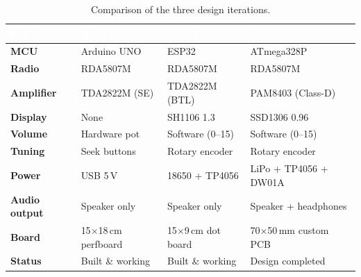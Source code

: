 \begin{table}[htbp]
\centering
\caption{Comparison of the three design iterations.}
\label{tab:iteration-comparison}
\small
\renewcommand{\arraystretch}{1.25}
\begin{tabularx}{\textwidth}{>{\bfseries}l X X X}
\toprule
\rowcolor{tablehead}
\textcolor{white}{\textsf{Feature}} &
\textcolor{white}{\textsf{Iter.\ 1}} &
\textcolor{white}{\textsf{Iter.\ 2}} &
\textcolor{white}{\textsf{Iter.\ 3}} \\
\midrule
\rowcolor{zebrarow}
MCU         & Arduino UNO          & ESP32                & ATmega328P \\
Radio       & RDA5807M             & RDA5807M             & RDA5807M \\
\rowcolor{zebrarow}
Amplifier   & TDA2822M (SE)        & TDA2822M (BTL)       & PAM8403 (Class-D) \\
Display     & None                 & SH1106 1.3\textquotedbl{} & SSD1306 0.96\textquotedbl{} \\
\rowcolor{zebrarow}
Volume      & Hardware pot         & Software (0--15)     & Software (0--15) \\
Tuning      & Seek buttons         & Rotary encoder       & Rotary encoder \\
\rowcolor{zebrarow}
Power       & USB 5\,V             & 18650 + TP4056       & LiPo + TP4056 + DW01A \\
Audio output& Speaker only         & Speaker only         & Speaker + headphones \\
\rowcolor{zebrarow}
Board       & 15$\times$18\,cm perfboard & 15$\times$9\,cm dot board & 70$\times$50\,mm custom PCB \\
Status      & Built \& working     & Built \& working     & Design completed \\
\bottomrule
\end{tabularx}
\end{table}
